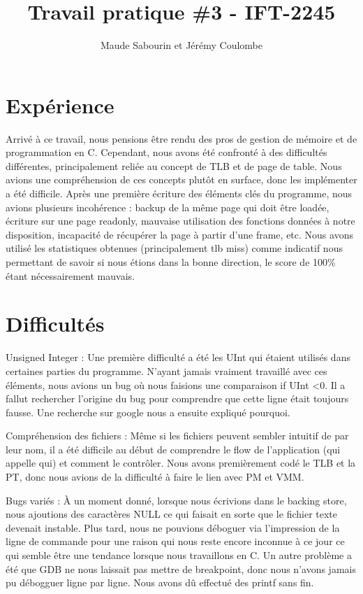 \documentclass{article}
\title{Travail pratique \#3 - IFT-2245}
\author{Maude Sabourin et Jérémy Coulombe}
\begin{document}
\maketitle

\section{Expérience}
Arrivé à ce travail, nous pensions être rendu des pros de gestion de mémoire et de programmation en C. Cependant, nous avons été confronté à des difficultés différentes, principalement reliée au concept de TLB et de page de table. Nous avions une compréhension de ces concepts plutôt en surface, donc les implémenter a été difficile. Après une première écriture des éléments clés du programme, nous avions plusieurs incohérence : backup de la même page qui doit être loadée, écriture sur une page readonly, mauvaise utilisation des fonctions données à notre disposition, incapacité de récupérer la page à partir d’une frame, etc. Nous avons utilisé les statistiques obtenues (principalement tlb miss) comme indicatif nous permettant de savoir si nous étions dans la bonne direction, le score de 100\% étant nécessairement mauvais.


\section {Difficultés}
\par
Unsigned Integer : Une première difficulté a été les UInt qui étaient utilisés dans certaines parties du programme. N’ayant jamais vraiment travaillé avec ces éléments, nous avions un bug où nous faisions une comparaison if UInt \textless  0. Il a fallut rechercher l’origine du bug pour comprendre que cette ligne était toujours fausse. Une recherche sur google nous a ensuite expliqué pourquoi. 

\par
Compréhension des fichiers : Même si les fichiers peuvent sembler intuitif de par leur nom, il a été difficile au début de comprendre le flow de l’application (qui appelle qui) et comment le contrôler. Nous avons premièrement codé le TLB et la PT, donc nous avions de la difficulté à faire le lien avec PM et VMM. 

\par
Bugs variés : À un moment donné, lorsque nous écrivions dans le backing store, nous ajoutions des caractères NULL ce qui faisait en sorte que le fichier texte devenait instable. Plus tard, nous ne pouvions déboguer via l’impression de la ligne de commande pour une raison qui nous reste encore inconnue à ce jour ce qui semble être une tendance lorsque nous travaillons en C. Un autre problème a été que GDB ne nous laissait pas mettre de breakpoint, donc nous n’avons jamais pu débogguer ligne par ligne. Nous avons dû effectué des printf sans fin.
\end{document}
